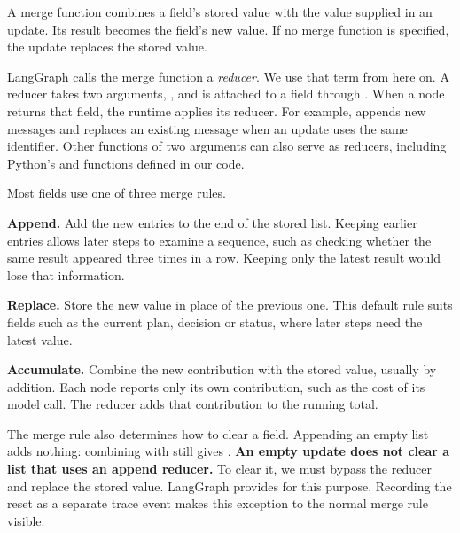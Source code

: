 \begin{definition}
\label{def:reducer}
A merge function combines a field's stored value with the value supplied in an update. Its
result becomes the field's new value. If no merge function is specified, the update replaces
the stored value.
\end{definition}

LangGraph calls the merge function a \emph{reducer}. We use that term from here on. A reducer
takes two arguments, , and is attached to a field through
. When a node returns that field, the runtime applies its reducer.
For example,  appends new messages and replaces an existing message when
an update uses the same identifier. Other functions of two arguments can also serve as
reducers, including Python's  and functions defined in our code.

Most fields use one of three merge rules.

\bi

\item \textbf{Append.} Add the new entries to the end of the stored list. Keeping earlier entries
allows later steps to examine a sequence, such as checking whether the same result appeared
three times in a row. Keeping only the latest result would lose that information.

\item \textbf{Replace.} Store the new value in place of the previous one. This default rule suits
fields such as the current plan, decision or status, where later steps need the latest value.

\item \textbf{Accumulate.} Combine the new contribution with the stored value, usually by
addition. Each node reports only its own contribution, such as the cost of its model call.
The reducer adds that contribution to the running total.

\ei

The merge rule also determines how to clear a field. Appending an empty list adds nothing:
combining \demoref{[]} with \demoref{[x, y]} still gives \demoref{[x, y]}.
\textbf{An empty update does not clear a list that uses an append reducer.} To clear it, we must
bypass the reducer and replace the stored value. LangGraph provides  for
this purpose. Recording the reset as a separate trace event makes this exception to the normal
merge rule visible.


